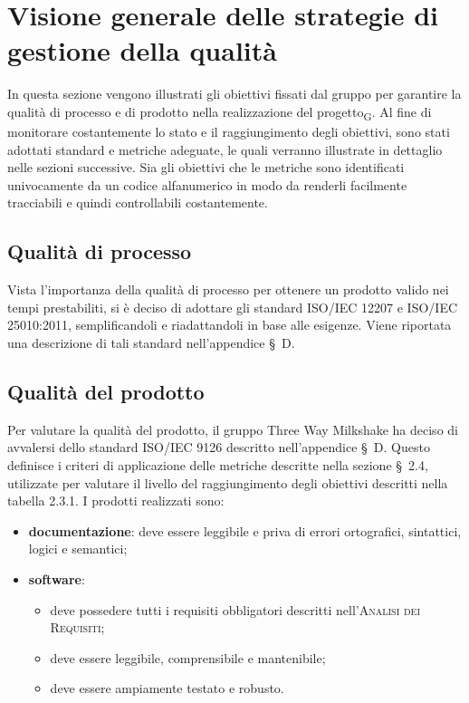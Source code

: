 \section{Visione generale delle strategie di gestione della qualità}
In questa sezione vengono illustrati gli obiettivi fissati dal gruppo per garantire la qualità di processo e di prodotto nella realizzazione del progetto\textsubscript{G}.
Al fine di monitorare costantemente lo stato e il raggiungimento degli obiettivi, sono stati adottati standard e metriche adeguate, le quali verranno illustrate in dettaglio nelle sezioni successive.
Sia gli obiettivi che le metriche sono identificati univocamente da un codice alfanumerico in modo da renderli facilmente tracciabili e quindi controllabili costantemente.

\subsection{Qualità di processo}
Vista l'importanza della qualità di processo per ottenere un prodotto valido nei tempi prestabiliti, si è deciso di adottare gli standard ISO/IEC 12207 e ISO/IEC 25010:2011, semplificandoli e riadattandoli in base alle esigenze. Viene riportata una descrizione di tali standard nell'appendice \S\ D.

\subsection{Qualità del prodotto}
Per valutare la qualità del prodotto, il gruppo Three Way Milkshake ha deciso di avvalersi dello standard ISO/IEC 9126 descritto nell'appendice \S\ D. Questo definisce i criteri di applicazione delle metriche descritte nella sezione \S\ 2.4, utilizzate per valutare il livello del raggiungimento degli obiettivi descritti nella tabella 2.3.1.
I prodotti realizzati sono:
\begin{itemize}
    \item \textbf{documentazione}: deve essere leggibile e priva di errori ortografici, sintattici, logici e semantici;
    \item \textbf{software}:
    \begin{itemize}
        \item deve possedere tutti i requisiti obbligatori descritti nell'\textsc{Analisi dei Requisiti};
        \item deve essere leggibile, comprensibile e mantenibile;
        \item deve essere ampiamente testato e robusto.
    \end{itemize}
\end{itemize}

